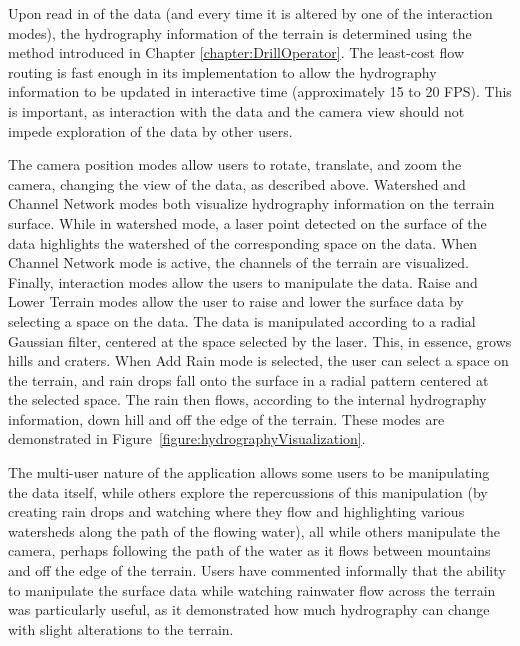 Upon read in of the data (and every time it is altered by one of the
interaction modes), the hydrography information of the terrain is
determined using 
the method introduced in Chapter \ref{chapter:DrillOperator}.
The least-cost flow routing is fast
enough in its implementation to allow the hydrography information to
be updated in interactive time (approximately 15 to 20 FPS). This is
important, as interaction with the data and the camera view should not
impede exploration of the data by other users.

The camera position modes allow users to rotate, translate, and zoom the camera, changing the view of the data, as described above. Watershed and Channel Network modes both visualize hydrography information on the terrain surface. While in watershed mode, a laser point detected on the surface of the data highlights the watershed of the corresponding space on the data. When Channel Network mode is active, the channels of the terrain are visualized. 
Finally, interaction modes allow the users to manipulate the
data. Raise and Lower Terrain modes allow the user to raise and lower
the surface data by selecting a space on the data. The data is
manipulated according to a radial Gaussian filter, centered at the
space selected by the laser. This, in essence, grows hills and
craters. When Add Rain mode is selected, the user can select a space
on the terrain, and rain drops fall onto the surface in a radial
pattern centered at the selected space. The rain then flows, according
to the internal hydrography information, down hill and off the edge of
the terrain. These modes are demonstrated in
Figure~\ref{figure:hydrographyVisualization}.

The multi-user nature of the application allows some users to be manipulating the data itself, while others explore the repercussions of this manipulation (by creating rain drops and watching where they flow and highlighting various watersheds along the path of the flowing water), all while others manipulate the camera, perhaps following the path of the water as it flows between mountains and off the edge of the terrain. Users have commented informally that the ability to manipulate the surface data while watching rainwater flow across the terrain was particularly useful, as it demonstrated how much hydrography can change with slight alterations to the terrain.

